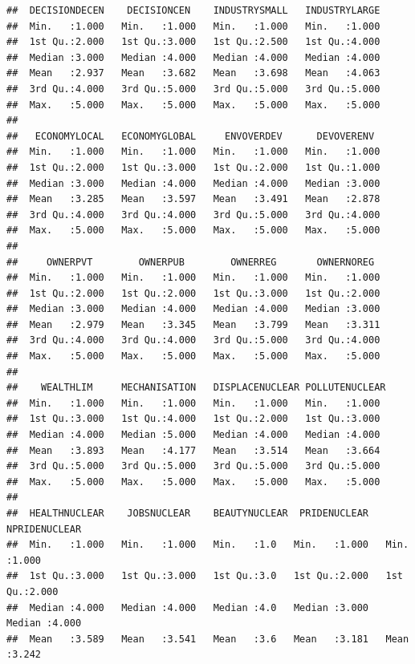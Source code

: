 \documentclass[
]{article}
\begin{document}
\begin{verbatim}
##  DECISIONDECEN    DECISIONCEN    INDUSTRYSMALL   INDUSTRYLARGE  
##  Min.   :1.000   Min.   :1.000   Min.   :1.000   Min.   :1.000  
##  1st Qu.:2.000   1st Qu.:3.000   1st Qu.:2.500   1st Qu.:4.000  
##  Median :3.000   Median :4.000   Median :4.000   Median :4.000  
##  Mean   :2.937   Mean   :3.682   Mean   :3.698   Mean   :4.063  
##  3rd Qu.:4.000   3rd Qu.:5.000   3rd Qu.:5.000   3rd Qu.:5.000  
##  Max.   :5.000   Max.   :5.000   Max.   :5.000   Max.   :5.000  
##                                                                 
##   ECONOMYLOCAL   ECONOMYGLOBAL     ENVOVERDEV      DEVOVERENV   
##  Min.   :1.000   Min.   :1.000   Min.   :1.000   Min.   :1.000  
##  1st Qu.:2.000   1st Qu.:3.000   1st Qu.:2.000   1st Qu.:1.000  
##  Median :3.000   Median :4.000   Median :4.000   Median :3.000  
##  Mean   :3.285   Mean   :3.597   Mean   :3.491   Mean   :2.878  
##  3rd Qu.:4.000   3rd Qu.:4.000   3rd Qu.:5.000   3rd Qu.:4.000  
##  Max.   :5.000   Max.   :5.000   Max.   :5.000   Max.   :5.000  
##                                                                 
##     OWNERPVT        OWNERPUB        OWNERREG       OWNERNOREG   
##  Min.   :1.000   Min.   :1.000   Min.   :1.000   Min.   :1.000  
##  1st Qu.:2.000   1st Qu.:2.000   1st Qu.:3.000   1st Qu.:2.000  
##  Median :3.000   Median :4.000   Median :4.000   Median :3.000  
##  Mean   :2.979   Mean   :3.345   Mean   :3.799   Mean   :3.311  
##  3rd Qu.:4.000   3rd Qu.:4.000   3rd Qu.:5.000   3rd Qu.:4.000  
##  Max.   :5.000   Max.   :5.000   Max.   :5.000   Max.   :5.000  
##                                                                 
##    WEALTHLIM     MECHANISATION   DISPLACENUCLEAR POLLUTENUCLEAR 
##  Min.   :1.000   Min.   :1.000   Min.   :1.000   Min.   :1.000  
##  1st Qu.:3.000   1st Qu.:4.000   1st Qu.:2.000   1st Qu.:3.000  
##  Median :4.000   Median :5.000   Median :4.000   Median :4.000  
##  Mean   :3.893   Mean   :4.177   Mean   :3.514   Mean   :3.664  
##  3rd Qu.:5.000   3rd Qu.:5.000   3rd Qu.:5.000   3rd Qu.:5.000  
##  Max.   :5.000   Max.   :5.000   Max.   :5.000   Max.   :5.000  
##                                                                 
##  HEALTHNUCLEAR    JOBSNUCLEAR    BEAUTYNUCLEAR  PRIDENUCLEAR   NPRIDENUCLEAR  
##  Min.   :1.000   Min.   :1.000   Min.   :1.0   Min.   :1.000   Min.   :1.000  
##  1st Qu.:3.000   1st Qu.:3.000   1st Qu.:3.0   1st Qu.:2.000   1st Qu.:2.000  
##  Median :4.000   Median :4.000   Median :4.0   Median :3.000   Median :4.000  
##  Mean   :3.589   Mean   :3.541   Mean   :3.6   Mean   :3.181   Mean   :3.242  

\end{verbatim}
\end{document}
